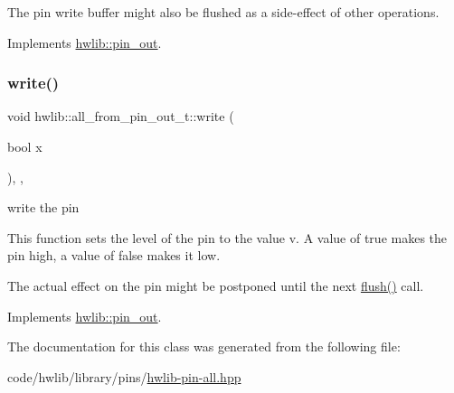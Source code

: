 The pin write buffer might also be flushed as a side-\/effect of other operations. 

Implements \hyperlink{classhwlib_1_1pin__out_ac22910317477a52431a44e7e3c66fc57}{hwlib\+::pin\+\_\+out}.

\mbox{\label{classhwlib_1_1all__from__pin__out__t_aa718f395267d22934d63c1d90ff83896}} 
\subsubsection{\texorpdfstring{write()}{write()}}
{\footnotesize\ttfamily void hwlib\+::all\+\_\+from\+\_\+pin\+\_\+out\+\_\+t\+::write (\begin{DoxyParamCaption}\item[{bool}]{x }\end{DoxyParamCaption})\hspace{0.3cm}{\ttfamily [inline]}, {\ttfamily [override]}, {\ttfamily [virtual]}}





write the pin

This function sets the level of the pin to the value v. A value of true makes the pin high, a value of false makes it low.

The actual effect on the pin might be postponed until the next \hyperlink{classhwlib_1_1all__from__pin__out__t_ad051258aabc84d5bc50bba6addb8d12c}{flush()} call. 

Implements \hyperlink{classhwlib_1_1pin__out_a8d260a70e503dcfb81987c408e170300}{hwlib\+::pin\+\_\+out}.



The documentation for this class was generated from the following file\+:\begin{DoxyCompactItemize}
\item 
code/hwlib/library/pins/\hyperlink{hwlib-pin-all_8hpp}{hwlib-\/pin-\/all.\+hpp}\end{DoxyCompactItemize}
